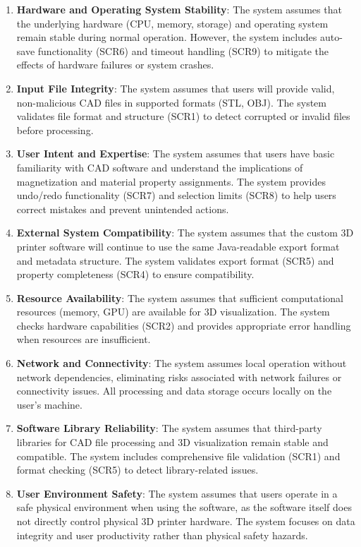 \documentclass{article}
\begin{document}
\begin{enumerate}
    \item \textbf{Hardware and Operating System Stability}: The system assumes that the underlying hardware (CPU, memory, storage) and operating system remain stable during normal operation. However, the system includes auto-save functionality (SCR6) and timeout handling (SCR9) to mitigate the effects of hardware failures or system crashes.

    \item \textbf{Input File Integrity}: The system assumes that users will provide valid, non-malicious CAD files in supported formats (STL, OBJ). The system validates file format and structure (SCR1) to detect corrupted or invalid files before processing.

    \item \textbf{User Intent and Expertise}: The system assumes that users have basic familiarity with CAD software and understand the implications of magnetization and material property assignments. The system provides undo/redo functionality (SCR7) and selection limits (SCR8) to help users correct mistakes and prevent unintended actions.

    \item \textbf{External System Compatibility}: The system assumes that the custom 3D printer software will continue to use the same Java-readable export format and metadata structure. The system validates export format (SCR5) and property completeness (SCR4) to ensure compatibility.

    \item \textbf{Resource Availability}: The system assumes that sufficient computational resources (memory, GPU) are available for 3D visualization. The system checks hardware capabilities (SCR2) and provides appropriate error handling when resources are insufficient.

    \item \textbf{Network and Connectivity}: The system assumes local operation without network dependencies, eliminating risks associated with network failures or connectivity issues. All processing and data storage occurs locally on the user's machine.

    \item \textbf{Software Library Reliability}: The system assumes that third-party libraries for CAD file processing and 3D visualization remain stable and compatible. The system includes comprehensive file validation (SCR1) and format checking (SCR5) to detect library-related issues.

    \item \textbf{User Environment Safety}: The system assumes that users operate in a safe physical environment when using the software, as the software itself does not directly control physical 3D printer hardware. The system focuses on data integrity and user productivity rather than physical safety hazards.
\end{enumerate}
\end{document}
